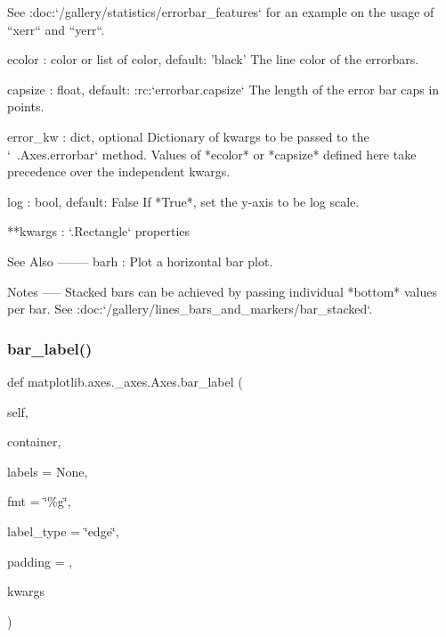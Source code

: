 \begin{DoxyVerb}
    See :doc:`/gallery/statistics/errorbar_features`
    for an example on the usage of ``xerr`` and ``yerr``.

ecolor : color or list of color, default: 'black'
    The line color of the errorbars.

capsize : float, default: :rc:`errorbar.capsize`
   The length of the error bar caps in points.

error_kw : dict, optional
    Dictionary of kwargs to be passed to the `~.Axes.errorbar`
    method. Values of *ecolor* or *capsize* defined here take
    precedence over the independent kwargs.

log : bool, default: False
    If *True*, set the y-axis to be log scale.

**kwargs : `.Rectangle` properties


See Also
--------
barh : Plot a horizontal bar plot.

Notes
-----
Stacked bars can be achieved by passing individual *bottom* values per
bar. See :doc:`/gallery/lines_bars_and_markers/bar_stacked`.
\end{DoxyVerb}
 \mbox{\label{classmatplotlib_1_1axes_1_1__axes_1_1Axes_a2f5e4b4e314f256c63aa028bacda3eef}} 
\subsubsection{\texorpdfstring{bar\+\_\+label()}{bar\_label()}}
{\footnotesize\ttfamily def matplotlib.\+axes.\+\_\+axes.\+Axes.\+bar\+\_\+label (\begin{DoxyParamCaption}\item[{}]{self,  }\item[{}]{container,  }\item[{}]{labels = {\ttfamily None},  }\item[{}]{fmt = {\ttfamily \char`\"{}\%g\char`\"{}},  }\item[{}]{label\+\_\+type = {\ttfamily \char`\"{}edge\char`\"{}},  }\item[{}]{padding = {},  }\item[{}]{kwargs }\end{DoxyParamCaption})}

